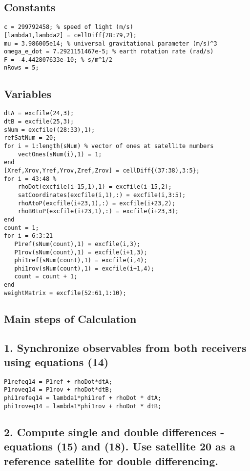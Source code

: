 \subsection*{Constants}

\begin{verbatim}
c = 299792458; % speed of light (m/s)
[lambda1,lambda2] = cellDiff{78:79,2};
mu = 3.986005e14; % universal gravitational parameter (m/s)^3
omega_e_dot = 7.2921151467e-5; % earth rotation rate (rad/s)
F = -4.442807633e-10; % s/m^1/2
nRows = 5;
\end{verbatim}


\subsection*{Variables}

\begin{verbatim}
dtA = excfile(24,3);
dtB = excfile(25,3);
sNum = excfile((28:33),1);
refSatNum = 20;
for i = 1:length(sNum) % vector of ones at satellite numbers
    vectOnes(sNum(i),1) = 1;
end
[Xref,Xrov,Yref,Yrov,Zref,Zrov] = cellDiff{(37:38),3:5};
for i = 43:48 %
    rhoDot(excfile(i-15,1),1) = excfile(i-15,2);
    satCoordinates(excfile(i,1),:) = excfile(i,3:5);
    rhoAtoP(excfile(i+23,1),:) = excfile(i+23,2);
    rhoB0toP(excfile(i+23,1),:) = excfile(i+23,3);
end
count = 1;
for i = 6:3:21
   P1ref(sNum(count),1) = excfile(i,3);
   P1rov(sNum(count),1) = excfile(i+1,3);
   phi1ref(sNum(count),1) = excfile(i,4);
   phi1rov(sNum(count),1) = excfile(i+1,4);
   count = count + 1;
end
weightMatrix = excfile(52:61,1:10);
\end{verbatim}


\subsection*{Main steps of Calculation}



\subsection*{1. Synchronize observables from both receivers using equations (14)}

\begin{verbatim}
P1refeq14 = P1ref + rhoDot*dtA;
P1roveq14 = P1rov + rhoDot*dtB;
phi1refeq14 = lambda1*phi1ref + rhoDot * dtA;
phi1roveq14 = lambda1*phi1rov + rhoDot * dtB;
\end{verbatim}


\subsection*{2. Compute single and double differences - equations (15) and (18). Use satellite 20 as a reference satellite for double differencing.}


